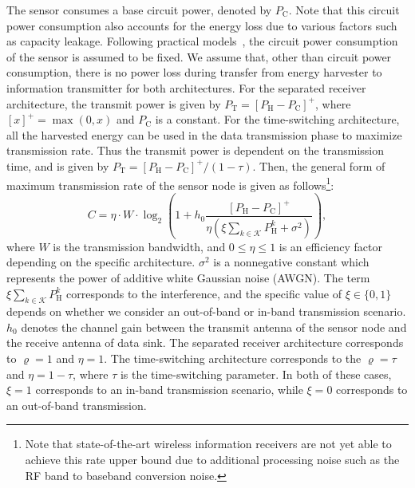 \documentclass[12pt,draftclsnofoot,onecolumn]{IEEEtran}
\begin{document}
The sensor consumes a base circuit power, denoted by $P_{\mathrm{C}}$. Note that this circuit power consumption also accounts for the energy loss due to various factors such as capacity leakage. Following practical models~\cite{G2009Miao}, the circuit power consumption of the sensor is assumed to be fixed. We assume that, other than circuit power consumption, there is no power loss during transfer from energy harvester to information transmitter for both architectures.
For the separated receiver architecture, the transmit power is given by $P_{\mathrm{T}} = \left[	P_{\mathrm{H}} - P_{\mathrm{C}} \right]^+$, where $[x]^+ = \max(0, x)$ and $P_{\mathrm{C}}$ is a constant. For the time-switching architecture, all the harvested energy can be used in the data transmission phase to maximize transmission rate. Thus the transmit power is dependent on the transmission time, and is given by $P_{\mathrm{T}} = \left[	P_{\mathrm{H}} - P_{\mathrm{C}} \right]^+/(1-\tau)$.
Then, the general form of maximum transmission rate of the sensor node is given as follows\footnote{Note that state-of-the-art wireless information receivers are not yet able to achieve this rate upper bound due to additional processing noise such as the RF band to baseband conversion noise.}:
\begin{equation}
\label{eq:maxtransmission}
	C	=	\eta\cdot W \cdot \log_2	\left(	1 + h_0	\frac {	\left[	P_{\mathrm{H}} - P_{\mathrm{C}} \right]^+	}	{\eta(\xi\sum_{k\in\mathcal K}P_{\mathrm H}^k+\sigma^2)} 	\right),
\end{equation}
where $W$ is the transmission bandwidth, and $0\le\eta\le 1$ is an efficiency factor depending on the specific architecture. $\sigma^2$ is a nonnegative constant which represents the power of additive white Gaussian noise (AWGN). The term $\xi\sum_{k\in\mathcal K}P_{\mathrm H}^k$ corresponds to the interference, and the specific value of $\xi\in\{0,1\}$ depends on whether we consider an out-of-band or in-band transmission scenario. $h_0$ denotes the channel gain between the transmit antenna of the sensor node and the receive antenna of data sink. 
The separated receiver architecture corresponds to $\varrho=1$ and $\eta=1$.
The time-switching architecture corresponds to the $\varrho=\tau$ and $\eta=1-\tau$, where $\tau$ is the time-switching parameter.
In both of these cases, $\xi=1$ corresponds to an in-band transmission scenario, while $\xi=0$ corresponds to an out-of-band transmission.
\end{document}
